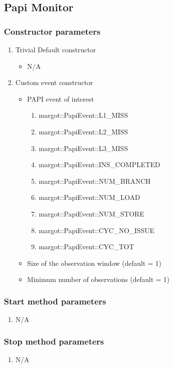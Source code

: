 \subsection{Papi Monitor}

\subsubsection*{Constructor parameters}
\begin{enumerate}
	\item Trivial Default constructor
		\begin{itemize}
			\item[] N/A
		\end{itemize}
	\item Custom event constructor
		\begin{itemize}
			\item PAPI event of interest
				\begin{enumerate}
					\item margot::PapiEvent::L1\_MISS
					\item margot::PapiEvent::L2\_MISS
					\item margot::PapiEvent::L3\_MISS
					\item margot::PapiEvent::INS\_COMPLETED
					\item margot::PapiEvent::NUM\_BRANCH
					\item margot::PapiEvent::NUM\_LOAD
					\item margot::PapiEvent::NUM\_STORE
					\item margot::PapiEvent::CYC\_NO\_ISSUE
					\item margot::PapiEvent::CYC\_TOT
				\end{enumerate}
			\item Size of the observation window (default = 1)
			\item Minimum number of observations (default = 1)
		\end{itemize}
\end{enumerate}

\subsubsection*{Start method parameters}
\begin{enumerate}
	\item[] N/A
\end{enumerate}


\subsubsection*{Stop method parameters}
\begin{enumerate}
	\item[] N/A
\end{enumerate}








